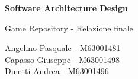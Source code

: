 \documentclass{article}
\begin{document}
\begin{titlepage}
    \begin{center}
        \vspace*{1cm}
            
        \Huge
        \textbf{Software Architecture Design}
            
        \vspace{0.5cm}
        \LARGE
        Game Repository - Relazione finale
        
        \vfill
        \vspace{0.8cm}
        
        \Large
        Angelino Pasquale - M63001481 \\
        Capasso Giuseppe -  M63001498 \\
        Dinetti Andrea -  M63001496

    \end{center}
\end{titlepage}

\thispagestyle{empty}

\printglossaries

\newpage
\thispagestyle{empty}
\tableofcontents

\newpage
\thispagestyle{empty}
\end{document}
